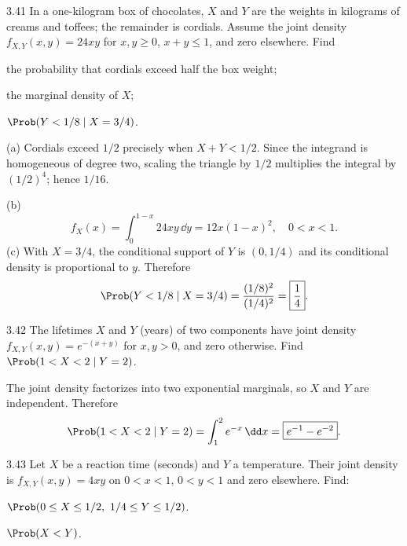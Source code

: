 \documentclass[11pt,oneside]{article}
\begin{document}
\begin{exercise}{3.41}
In a one-kilogram box of chocolates, $X$ and $Y$ are the weights in kilograms of creams and toffees; the remainder is cordials. Assume the joint density $f_{X,Y}(x,y)=24xy$ for $x,y\ge0$, $x+y\le1$, and zero elsewhere. Find
\par
\begin{exercisesubparts}
\item the probability that cordials exceed half the box weight;
\item the marginal density of $X$;
\item $\Prob(Y<1/8\mid X=3/4)$.
\end{exercisesubparts}
\end{exercise}

\begin{solution}
\textup{(a)} Cordials exceed $1/2$ precisely when $X+Y<1/2$. Since the integrand is homogeneous of degree two, scaling the triangle by $1/2$ multiplies the integral by $(1/2)^4$; hence $\boxed{1/16}$.\par\medskip
\noindent\textup{(b)}
\[
f_X(x)=\int_0^{1-x}24xy\,\dd y=\boxed{12x(1-x)^2},\quad 0<x<1.
\]
\noindent\textup{(c)} With $X=3/4$, the conditional support of $Y$ is $(0,1/4)$ and its conditional density is proportional to $y$. Therefore
\[
\Prob(Y<1/8\mid X=3/4)=\frac{(1/8)^2}{(1/4)^2}=\boxed{\frac14}.
\]
\end{solution}

\begin{exercise}{3.42}
The lifetimes $X$ and $Y$ (years) of two components have joint density $f_{X,Y}(x,y)=e^{-(x+y)}$ for $x,y>0$, and zero otherwise. Find $\Prob(1<X<2\mid Y=2)$.
\end{exercise}

\begin{solution}
The joint density factorizes into two exponential marginals, so $X$ and $Y$ are independent. Therefore
\[
\Prob(1<X<2\mid Y=2)=\int_1^2e^{-x}\,\dd x=\boxed{e^{-1}-e^{-2}}.
\]
\end{solution}

\begin{exercise}{3.43}
Let $X$ be a reaction time (seconds) and $Y$ a temperature. Their joint density is $f_{X,Y}(x,y)=4xy$ on $0<x<1$, $0<y<1$ and zero elsewhere. Find:
\begin{exercisesubparts}
\item $\Prob(0\le X\le1/2,\ 1/4\le Y\le1/2)$.
\item $\Prob(X<Y)$.
\end{exercisesubparts}
\end{exercise}
\end{document}
